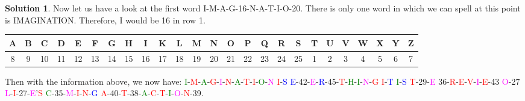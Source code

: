 \documentclass[11pt]{article}
\theoremstyle{definition}\newtheorem{definition}{Definition}
\theoremstyle{definition}\newtheorem{question}{Question}
\theoremstyle{definition}\newtheorem*{solution}{Solution}
\begin{document}
\begin{solution}
    Now let us have a look at the first word I-M-A-G-16-N-A-T-I-O-20. There is only one word in which we can spell at this point is IMAGINATION. Therefore, I would be 16 in row 1.
    \begin{center}\tiny\hspace*{-20pt}
        \begin{tabular}{ccccccccccccccccccccccccc} \hline
            A & B & C & D & E & F & G & H & I & K & L & M & N & O & P & Q & R & S & T & U & V & W & X & Y & Z \\ \hline
            8 & 9 & 10 & 11 & 12 & 13 & 14 & 15 & 16 & 17 & 18 & 19 & 20 & 21 & 22 & 23 & 24 & 25 & 1 & 2 & 3 & 4 & 5 & 6 & 7 \\ \hline
        \end{tabular}
    \end{center}
    Then with the information above, we now have: \textcolor{green}{I}-\textcolor{red}{M}-\textcolor{green}{A}-\textcolor{red}{G}-\textcolor{magenta}{I}-\textcolor{red}{N}-\textcolor{green}{A}-\textcolor{red}{T}-\textcolor{red}{I}-\textcolor{green}{O}-\textcolor{magenta}{N} \textcolor{red}{I}-\textcolor{blue}{S} \textcolor{blue}{E}-42-\textcolor{magenta}{E}-\textcolor{blue}{R}-45-\textcolor{red}{T}-\textcolor{green}{H}-\textcolor{green}{I}-\textcolor{magenta}{N}-\textcolor{red}{G} \textcolor{red}{I}-\textcolor{blue}{T} \textcolor{green}{I}-\textcolor{blue}{S} \textcolor{red}{T}-29-\textcolor{magenta}{E} 36-\textcolor{red}{R}-\textcolor{red}{E}-\textcolor{red}{V}-\textcolor{magenta}{I}-\textcolor{red}{E}-43 \textcolor{magenta}{O}-27 \textcolor{magenta}{L}-\textcolor{red}{I}-27-\textcolor{magenta}{E}'\textcolor{red}{S} \textcolor{green}{C}-35-\textcolor{magenta}{M}-\textcolor{red}{I}-\textcolor{red}{N}-\textcolor{blue}{G} \textcolor{red}{A}-40-\textcolor{red}{T}-38-\textcolor{green}{A}-\textcolor{red}{C}-\textcolor{red}{T}-\textcolor{green}{I}-\textcolor{magenta}{O}-\textcolor{red}{N}-39.


\end{solution}
\end{document}
